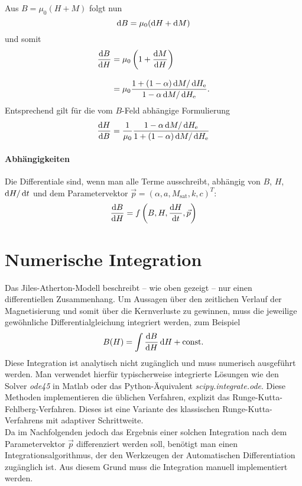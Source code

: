\documentclass{scrartcl}
\newcommand{\He}{H_\text{e}}
\newcommand{\Msat}{M_\text{sat}}
\begin{document}
Aus $B = \mu_0(H + M)$ folgt nun
\begin{equation}
	\mathop{}\!\mathrm{d} B = \mu_0 (\mathop{}\!\mathrm{d} H + \mathop{}\!\mathrm{d} M)
\end{equation}
und somit
\begin{equation}
\begin{aligned}
	\frac{\dif B}{\dif H} &= \mu_0 \left(1 + \frac{\dif M}{\dif H}\right)\\[0.3cm]
	&= \mu_0 \frac{1 + (1-\alpha)\dif M/\dif \He}{1 - \alpha \dif M/\dif \He}. \label{eq:dB_dH}
\end{aligned}
\end{equation}\vspace{0.3cm}
Entsprechend gilt für die vom $B$-Feld abhängige Formulierung
\begin{equation}
	\frac{\dif H}{\dif B} = \frac{1}{\mu_0} \frac{1 - \alpha \dif M/\dif \He}{1 + (1-\alpha)\dif M/\dif \He}
\end{equation}
\paragraph{Abhängigkeiten}
Die Differentiale sind, wenn man alle Terme ausschreibt, abhängig von $B$, $H$, $\mathop{}\!\mathrm{d} H/\mathop{}\!\mathrm{d} t$ und dem Parametervektor $\vec{p} = (\alpha, a, \Msat, k, c)^T$:
\begin{equation}
	\frac{\mathop{}\!\mathrm{d} B}{\mathop{}\!\mathrm{d} H} = f\left(B, H, \frac{\mathop{}\!\mathrm{d} H}{\mathop{}\!\mathrm{d} t}, \vec p \right)
\end{equation}
\section{Numerische Integration}
\label{sec:numeric-integration}
Das Jiles-Atherton-Modell beschreibt -- wie oben gezeigt -- nur einen differentiellen Zusammenhang. Um Aussagen über den zeitlichen Verlauf der Magnetisierung und somit über die Kernverluste zu gewinnen, muss die jeweilige gewöhnliche Differentialgleichung integriert werden, zum Beispiel
\begin{equation}
B(H) = \int \frac{\mathop{}\!\mathrm{d} B}{\mathop{}\!\mathrm{d} H}\mathop{}\!\mathrm{d} H + \text{const.}
\end{equation}
Diese Integration ist analytisch nicht zugänglich und muss numerisch ausgeführt werden. Man verwendet hierfür typischerweise integrierte Lösungen wie den Solver \emph{ode45} in Matlab oder das Python-Äquivalent \emph{scipy.integrate.ode}. Diese Methoden implementieren die üblichen Verfahren, explizit das Runge-Kutta-Fehlberg-Verfahren. Dieses ist eine Variante des klassischen Runge-Kutta-Verfahrens mit adaptiver Schrittweite.\\
Da im Nachfolgenden jedoch das Ergebnis einer solchen Integration nach dem Parametervektor $\vec p$ differenziert werden soll, benötigt man einen Integrationsalgorithmus, der den Werkzeugen der Automatischen Differentiation zugänglich ist. Aus diesem Grund muss die Integration manuell implementiert werden.
\end{document}
